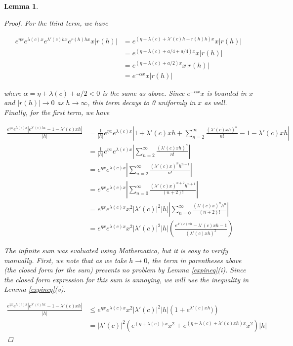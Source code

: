 \documentclass[12pt]{article}
\newtheorem{lemma}{Lemma}
\begin{document}
\begin{lemma}
\begin{proof}
For the third term, we have

\begin{align*}
e^{\eta x} e^{\lambda(c)x} e^{\lambda'(c)hx} e^{r(h)h x} x |r(h)| &= e^{(\eta + \lambda(c) + \lambda'(c)h + r(h)h)x}x|r(h)| \\
&= e^{(\eta + \lambda(c) + a/4 + a/4)x}x|r(h)| \\
&= e^{(\eta + \lambda(c) + a/2)x}x|r(h)| \\
&= e^{-\alpha x}x|r(h)|
\end{align*}

where $\alpha = \eta + \lambda(c) + a/2  < 0$ is the same as above. Since $e^{-\alpha x}x$ is bounded in $x$ and $|r(h)| \rightarrow 0$ as $h \rightarrow \infty$, this term decays to 0 uniformly in $x$ as well.\\

Finally, for the first term, we have

\begin{align*}
\frac{e^{\eta x} e^{\lambda(c)x}| e^{\lambda'(c)hx} - 1 - \lambda'(c)x h|}{|h|} &= \frac{1}{|h|}e^{\eta x} e^{\lambda(c)x} \left| 1 + \lambda'(c)xh + \sum_{n = 2}^\infty \frac{(\lambda'(c)xh)^n}{n!} - 1 - \lambda'(c)xh\right|\\
&= \frac{1}{|h|}e^{\eta x} e^{\lambda(c)x} \left| \sum_{n = 2}^\infty \frac{(\lambda'(c)xh)^n}{n!} \right| \\
&= e^{\eta x} e^{\lambda(c)x} \left| \sum_{n = 2}^\infty \frac{(\lambda'(c)x)^n h^{n-1}}{n!} \right| \\
&= e^{\eta x} e^{\lambda(c)x} \left| \sum_{n = 0}^\infty \frac{(\lambda'(c)x)^{n+2} h^{n+1}}{(n+2)!} \right|\\
&= e^{\eta x} e^{\lambda(c)x} x^2 |\lambda'(c)|^2 |h| \left| \sum_{n = 0}^\infty \frac{(\lambda'(c)x)^{n} h^{n}}{(n+2)!} \right|\\
&= e^{\eta x} e^{\lambda(c)x} x^2 |\lambda'(c)|^2 |h| \left( \frac{e^{\lambda'(c)xh} - \lambda'(c)xh - 1}{(\lambda'(c)xh)^2} \right)
\end{align*}

The infinite sum was evaluated using Mathematica, but it is easy to verify manually. First, we note that as we take $h \rightarrow 0$, the term in parentheses above (the closed form for the sum) presents no problem by Lemma \ref{expineq}(i). Since the closed form expression for this sum is annoying, we will use the inequality in Lemma \ref{expineq}(v).

\begin{align*}
\frac{e^{\eta x} e^{\lambda(c)x}| e^{\lambda'(c)hx} - 1 - \lambda'(c)x h|}{|h|} &\leq e^{\eta x} e^{\lambda(c)x} x^2 |\lambda'(c)|^2 |h| \left( 1 + e^{\lambda'(c)xh} )\right) \\
&= |\lambda'(c)|^2  \left( e^{(\eta + \lambda(c)) x}x^2 + e^{(\eta + \lambda(c) + \lambda'(c)xh)x} x^2 \right)|h|
\end{align*}


\end{proof}
\end{lemma}
\end{document}

